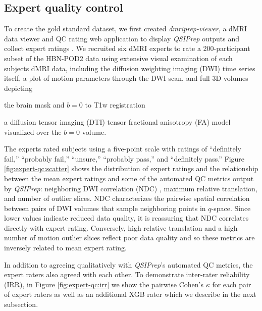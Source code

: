 \documentclass[fleqn,10pt]{wlscirep}
\begin{document}
\subsection*{Expert quality control}

To create the gold standard dataset, we first created \emph{dmriprep-viewer}, a
dMRI data viewer and QC rating web application to display \emph{QSIPrep} outputs
and collect expert ratings \cite{richie-halford2021-viewer}.  We recruited six
dMRI experts to rate a 200-participant subset of the HBN-POD2 data using
extensive visual examination of each subjects dMRI data, including the diffusion
weighting imaging (DWI) time series itself, a plot of motion parameters through
the DWI scan, and full 3D volumes depicting
\begin{enumerate*}[%
    label=(\roman*),%
    before={{ }},%
    itemjoin={{, }},%
    itemjoin*={{ and }}]
    \item the brain mask and $b=0$ to T1w registration
    \item a diffusion tensor imaging (DTI) tensor fractional anisotropy (FA)
    model visualized over the $b=0$ volume.
\end{enumerate*}
The experts rated subjects using a five-point scale with ratings of ``definitely
fail,'' ``probably fail,'' ``unsure,'' ``probably pass,'' and ``definitely
pass.'' Figure \ref{fig:expert-qc:scatter} shows the distribution of expert
ratings and the relationship between the mean expert ratings and some of the
automated QC metrics output by \emph{QSIPrep}: neighboring DWI correlation (NDC)
\cite{yeh2019-kb}, maximum relative translation, and number of outlier slices.
NDC characterizes the pairwise spatial correlation between pairs of DWI volumes
that sample neighboring points in $q$-space. Since lower values indicate reduced
data quality, it is reassuring that NDC correlates directly with expert rating.
Conversely, high relative translation and a high number of motion outlier slices
reflect poor data quality and so these metrics are inversely related to mean
expert rating.

In addition to agreeing qualitatively with \emph{QSIPrep}'s automated QC
metrics, the expert raters also agreed with each other. To demonstrate
inter-rater reliability (IRR), in Figure \ref{fig:expert-qc:irr} we show the
pairwise Cohen's $\kappa$ \cite{di_eugenio2004-bb} for each pair of expert
raters as well as an additional XGB rater which we describe in the next
subsection.
\end{document}
